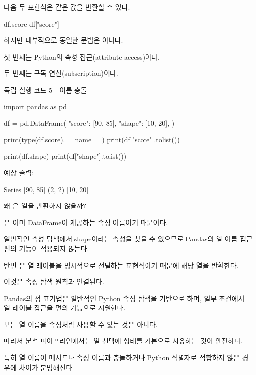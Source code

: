 다음 두 표현식은 같은 값을 반환할 수 있다.

\begin{dhkcode}
df.score
df["score"]
\end{dhkcode}

하지만 내부적으로 동일한 문법은 아니다.

첫 번재는 Python의 속성 접근(attribute access)이다.

두 번째는 구독 연산(subscription)이다.

\begin{dhknote}
\begin{dhksmry}[centered]
독립 실행 코드 5 - 이름 충돌
\end{dhksmry}
\end{dhknote}

\begin{dhkcode}
import pandas as pd

df = pd.DataFrame({
    "score": [90, 85],
    "shape": [10, 20],
})

print(type(df.score).__name__)
print(df["score"].tolist())

print(df.shape)
print(df["shape"].tolist())
\end{dhkcode}

예상 출력:

\begin{dhkzsh}
Series
[90, 85]
(2, 2)
[10, 20]
\end{dhkzsh}

왜 은  열을 반환하지 않을까?

은 이미 DataFrame이 제공하는 속성 이름이기 때문이다.

일반적인 속성 탐색에서 shape이라는 속성을 찾을 수 있으므로 Pandas의 열 이름 접근 편의 기능이 적용되지 않는다.

반면 은 열 레이블을 명시적으로 전달하는 표현식이기 때문에 해당 열을 반환한다.

이것은 속성 탐색 원칙과 연결된다.

Pandas의 점 표기법은 일반적인 Python 속성 탐색을 기반으로 하며, 일부 조건에서 열 레이블 접근을 편의 기능으로 지원한다.

모든 열 이름을 속성처럼 사용할 수 있는 것은 아니다.

따라서 분석 파이프라인에서는 열 선택에  형태를 기본으로 사용하는 것이 안전하다.

특히 열 이름이 메서드나 속성 이름과 충돌하거나 Python 식별자로 적합하지 않은 경우에 차이가 분명해진다.

